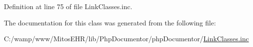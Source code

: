 \-Definition at line 75 of file \-Link\-Classes.\-inc.



\-The documentation for this class was generated from the following file\-:\begin{DoxyCompactItemize}
\item 
\-C\-:/wamp/www/\-Mitos\-E\-H\-R/lib/\-Php\-Documentor/php\-Documentor/\hyperlink{_link_classes_8inc}{\-Link\-Classes.\-inc}\end{DoxyCompactItemize}
